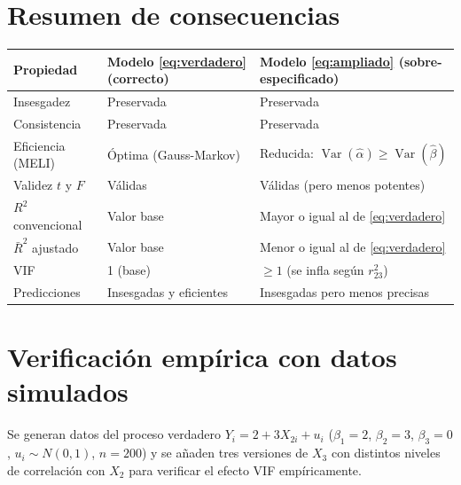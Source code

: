 \documentclass[12pt, letterpaper]{article}
\newcommand{\Var}{\operatorname{Var}}
\begin{document}
\section{Resumen de consecuencias}

\begin{center}
\renewcommand{\arraystretch}{1.4}
\small
\begin{tabular}{p{3.8cm}p{3.8cm}p{3.8cm}}
\toprule
\textbf{Propiedad}
  & \textbf{Modelo \eqref{eq:verdadero}} \newline (correcto)
  & \textbf{Modelo \eqref{eq:ampliado}} \newline (sobre-especificado) \\
\midrule
Insesgadez             & Preservada                  & Preservada \\
Consistencia           & Preservada                  & Preservada \\
Eficiencia (MELI)      & Óptima (Gauss-Markov)       & Reducida: $\Var(\hat{\alpha}) \geq \Var(\hat{\beta})$ \\
Validez $t$ y $F$      & Válidas                     & Válidas (pero menos potentes) \\
$R^2$ convencional     & Valor base                  & Mayor o igual al de \eqref{eq:verdadero} \\
$\bar{R}^2$ ajustado   & Valor base                  & Menor o igual al de \eqref{eq:verdadero} \\
VIF                    & 1 (base)                    & $\geq 1$ (se infla según $r_{23}^2$) \\
Predicciones           & Insesgadas y eficientes     & Insesgadas pero menos precisas \\
\bottomrule
\end{tabular}
\end{center}

\section{Verificación empírica con datos simulados}

Se generan datos del proceso verdadero $Y_i = 2 + 3X_{2i} + u_i$
($\beta_1 = 2$, $\beta_2 = 3$, $\beta_3 = 0$, $u_i \sim N(0,1)$, $n = 200$)
y se añaden tres versiones de $X_3$ con distintos niveles de correlación
con $X_2$ para verificar el efecto VIF empíricamente.
\end{document}
